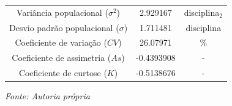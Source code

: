 \begin{enumerate}[label=\emph{\arabic*})]
\begin{enumerate}[label=\emph{\alph*})]
\begin{table}[]
{\begin{tabular}{ccc}
					            \multicolumn{1}{c|}{Variância populacional ($\sigma^{2}$)} & 2.929167                             & disciplina$_{2}$  \\
					            \multicolumn{1}{c|}{Desvio padrão populacional ($\sigma$)} & 1.711481                             & disciplina        \\
					            \multicolumn{1}{c|}{Coeficiente de variação ($CV$)}        & 26.07971                             & \%                \\
					            \multicolumn{1}{c|}{Coeficiente de assimetria ($As$)}      & -0.4393908                           & -                 \\
					            \multicolumn{1}{c|}{Coeficiente de curtose ($K$)}          & -0.5138676                           & -                 \\ \hline
				            \end{tabular}%
			            }
			            \label{tab:d-3}
			            \begin{minipage}{0.7\linewidth}
				            \emph{Fonte: Autoria própria}
			            \end{minipage}
		            \end{table}


\end{enumerate}
\end{enumerate}
